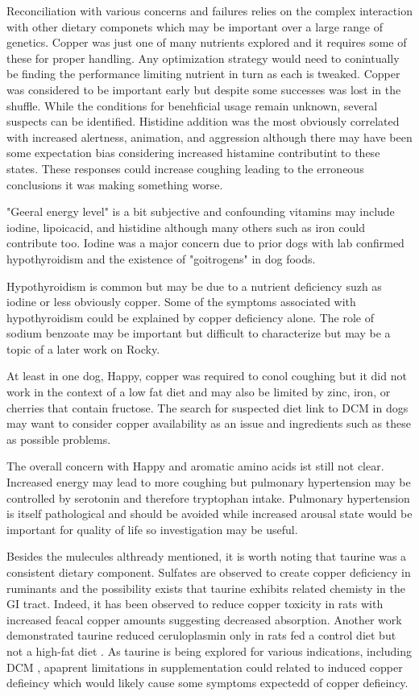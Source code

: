 Reconciliation with various concerns and failures
relies on the complex interaction with other dietary componets
which may be important over a large range of genetics. 
Copper was just one of many nutrients explored and
it requires some of these for proper handling.
Any optimization strategy would need to conintually
be finding the performance limiting nutrient
in turn as each is tweaked. 
Copper was considered to be important early but despite
some successes was lost in the shuffle. While the conditions
for benehficial usage remain unknown, several suspects
can be identified. Histidine addition was the most
obviously correlated with increased
alertness, animation, and aggression although there
may have been some expectation bias considering increased
histamine contributint to these states. These responses
could increase coughing leading to the erroneous
conclusions it was making something worse.    

"Geeral energy level" is a bit subjective and 
confounding vitamins may include iodine, lipoicacid,
and histidine although many others such as iron could
contribute too. Iodine was a major concern due to
prior dogs with lab confirmed hypothyroidism and the
existence of "goitrogens" in dog foods. 

Hypothyroidism is common but may be due to a nutrient
deficiency suzh as iodine or less obviously copper.
Some of the symptoms associated with hypothyroidism
could be explained by copper deficiency alone.
The role of sodium benzoate may be important but
difficult to characterize  but may be a topic of a later
work on Rocky.

At least in one dog, Happy, copper was required to conol
coughing but it did not work in the context of a low fat
diet and may also be limited by zinc, iron, or cherries
that contain fructose.  The search for suspected diet link to
DCM in dogs may want to consider copper availability as an
issue and ingredients such as these as possible problems.


The overall concern with Happy and aromatic amino acids
ist still not clear. Increased energy may lead to more
coughing but 
pulmonary hypertension may be controlled by serotonin
\cite{PMID27927914} and therefore tryptophan intake. 
Pulmonary hypertension is itself pathological and
should be avoided while increased arousal state would
be important for quality of life so investigation may be useful. 

Besides the mulecules althready mentioned, it is worth
noting that taurine was a consistent dietary component.
Sulfates are observed to create copper deficiency in ruminants
and the possibility exists that taurine exhibits related chemisty
in the GI tract. Indeed, it has been observed to reduce
copper toxicity in rats with increased feacal copper
amounts \cite{PMID9609396} suggesting decreased
absorption. 
Another work demonstrated taurine reduced ceruloplasmin only
in rats fed a  control diet but not a high-fat diet
\cite{Krol2020}.
As taurine is being explored for various indications,
including DCM \cite{PMC9257265},
apaprent limitations in supplementation could  related
to induced copper defieincy which would likely cause some
symptoms expectedd of copper defieincy.


